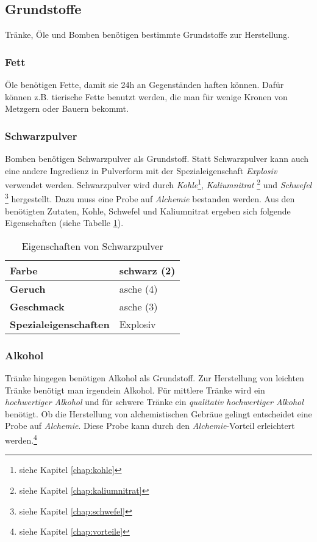 \subsection{Grundstoffe}
\label{chap:grundstoffe}
Tränke, Öle und Bomben benötigen bestimmte Grundstoffe zur Herstellung. 

\subsubsection{Fett}
\label{chap:fett}
Öle benötigen Fette, damit sie 24h an Gegenständen haften können. Dafür können z.B. tierische Fette benutzt werden, die man für wenige Kronen von Metzgern oder Bauern bekommt.

\subsubsection{Schwarzpulver}
\label{chap:schwarzpulver}
Bomben benötigen Schwarzpulver als Grundstoff. Statt Schwarzpulver kann auch eine andere Ingredienz in Pulverform mit der Spezialeigenschaft \textit{Explosiv} verwendet werden. Schwarzpulver wird durch \textit{Kohle}\footnote{siehe Kapitel \ref{chap:kohle}}, \textit{Kaliumnitrat} \footnote{siehe Kapitel \ref{chap:kaliumnitrat}} und \textit{Schwefel} \footnote{siehe Kapitel \ref{chap:schwefel}} hergestellt. Dazu muss eine Probe auf \textit{Alchemie} bestanden werden. Aus den benötigten Zutaten, Kohle, Schwefel und Kaliumnitrat ergeben sich folgende Eigenschaften (siehe Tabelle \ref{tab:schwarzpulver_eigenschaften}).

\begin{table}[H]
\begin{center}
\begin{tabular}{|l|l|}
\hline
\textbf{Farbe} & schwarz (2) \\ \hline
\textbf{Geruch} & asche (4) \\ \hline
\textbf{Geschmack} & asche (3) \\ \hline
\textbf{Spezialeigenschaften} & Explosiv \\ \hline
\end{tabular}
\end{center}
\caption{Eigenschaften von Schwarzpulver}
\label{tab:schwarzpulver_eigenschaften}
\end{table}

\subsubsection{Alkohol}
\label{chap:alkohol_grundstoff}
Tränke hingegen benötigen Alkohol als Grundstoff. Zur Herstellung von leichten Tränke benötigt man irgendein Alkohol. Für mittlere Tränke wird ein \textit{hochwertiger Alkohol} und für schwere Tränke ein \textit{qualitativ hochwertiger Alkohol} benötigt.  Ob die Herstellung von alchemistischen Gebräue gelingt entscheidet eine Probe auf \textit{Alchemie}. Diese Probe kann durch den \textit{Alchemie}-Vorteil erleichtert werden.\footnote{siehe Kapitel \ref{chap:vorteile}}

